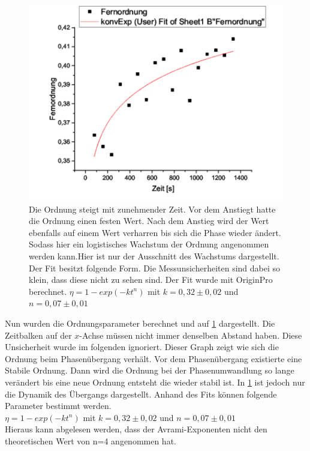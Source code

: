 \begin{figure}[h!]
    \centering
    \includegraphics[scale = 0.7]{M3/tex/fit.png}
    \caption{Die Ordnung steigt mit zunehmender Zeit. Vor dem Anstiegt hatte die Ordnung einen festen Wert. Nach dem Anstieg wird der Wert  ebenfalls auf einem Wert verharren bis sich die Phase wieder ändert. Sodass hier ein logistisches Wachstum der Ordnung angenommen werden kann.Hier ist nur der Ausschnitt des Wachstums dargestellt. Der Fit besitzt folgende Form. Die Messunsicherheiten sind dabei so klein, dass diese nicht zu sehen sind. Der Fit wurde mit OriginPro berechnet.
    $\eta = 1 - exp(-kt^n)$ mit $k=0,32 \pm 0,02$ und $n=0,07 \pm 0,01$}
    \label{A5}
\end{figure}

Nun wurden die Ordnungsparameter berechnet und auf \cref{A5} dargestellt. Die Zeitbalken auf der $x$-Achse müssen nicht immer denselben Abstand haben. Diese Unsicherheit wurde im folgenden ignoriert. Dieser Graph zeigt wie sich die Ordnung beim Phasenübergang verhält. Vor dem Phasenübergang existierte eine Stabile Ordnung. Dann wird die Ordnung bei der Phasenumwandlung so lange verändert bis eine neue Ordnung entsteht die wieder stabil ist. In \cref{A5} ist jedoch nur die Dynamik des Übergangs dargestellt. Anhand des Fits können folgende Parameter bestimmt werden. \\
$\eta = 1 - exp(-kt^n)$ mit $k=0,32 \pm 0,02$ und $n=0,07 \pm 0,01$\\
Hieraus kann abgelesen werden, dass der Avrami-Exponenten nicht den theoretischen Wert von n=4 angenommen hat.


